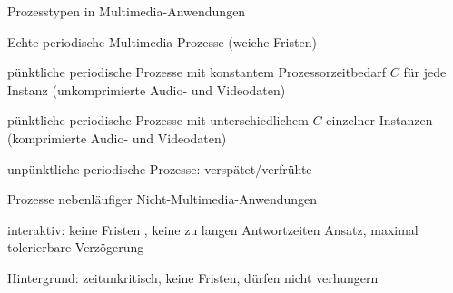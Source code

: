 \documentclass[a4paper]{article}
\begin{document}
\begin{multicols}{3}
    Prozesstypen in Multimedia-Anwendungen
    \begin{enumerate*}
        \item Echte periodische Multimedia-Prozesse (weiche Fristen)
        \begin{enumerate*}
            \item pünktliche periodische Prozesse mit konstantem Prozessorzeitbedarf $C$ für jede Instanz (unkomprimierte Audio- und Videodaten)
            \item pünktliche periodische Prozesse mit unterschiedlichem $C$ einzelner Instanzen (komprimierte Audio- und Videodaten)
            \item unpünktliche periodische Prozesse: verspätet/verfrühte
        \end{enumerate*}
        \item Prozesse nebenläufiger Nicht-Multimedia-Anwendungen
        \begin{itemize*}
            \item interaktiv: keine Fristen , keine zu langen Antwortzeiten Ansatz, maximal tolerierbare Verzögerung
            \item Hintergrund: zeitunkritisch, keine Fristen, dürfen nicht verhungern
        \end{itemize*}
    \end{enumerate*}


\end{multicols}
\end{document}
